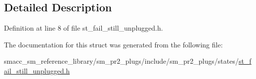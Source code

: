 \subsection{Detailed Description}


Definition at line 8 of file st\+\_\+fail\+\_\+still\+\_\+unplugged.\+h.



The documentation for this struct was generated from the following file\+:\begin{DoxyCompactItemize}
\item 
smacc\+\_\+sm\+\_\+reference\+\_\+library/sm\+\_\+pr2\+\_\+plugs/include/sm\+\_\+pr2\+\_\+plugs/states/\hyperlink{st__fail__still__unplugged_8h}{st\+\_\+fail\+\_\+still\+\_\+unplugged.\+h}\end{DoxyCompactItemize}
